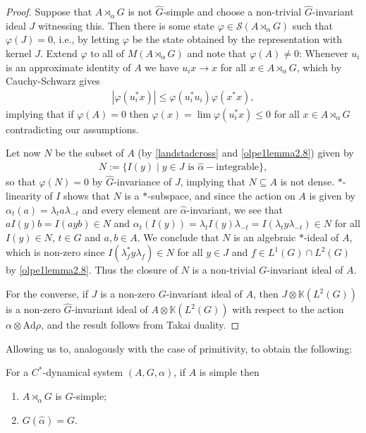 \begin{proof}
	Suppose that $A \rtimes_\alpha G$ is not $\hat G$-simple and choose a non-trivial $\hat G$-invariant ideal $J$ witnessing this. Then there is some state $\varphi \in \mathcal{S}(A \rtimes_\alpha G)$ such that $\varphi(J) = 0$, i.e., by letting $\varphi$ be the state obtained by the representation with kernel $J$. Extend $\varphi$ to all of $M(A \rtimes_\alpha G)$ and note that $\varphi(A) \neq 0$: Whenever $u_i$ is an approximate identity of $A$ we have $u_i x \to x$ for all $x \in A \rtimes_\alpha G$, which by Cauchy-Schwarz gives
	\begin{align*}
	|\varphi(u_i^* x)| \leq \varphi(u_i^*u_i)\varphi(x^*x),
	\end{align*}
	implying that if $\varphi(A) = 0$ then $\varphi(x) = \lim \varphi(u_i^* x) \leq 0$ for all $x \in A \rtimes_\alpha G$ contradicting our assumptions.
	
	Let now $N$ be the subset of $A$ (by \cref{landstadcross} and \cref{olpe1lemma2.8}) given by
	\begin{align*}
		N:=\{ I(y) \mid y \in J \text{ is } \hat \alpha-\text{integrable}\},
	\end{align*}
	so that $\varphi(N) = 0$ by $\hat G$-invariance of $J$, implying that $N \subseteq A$ is not dense. $*$-linearity of $I$ shows that $N$ is a $*$-subspace, and since the action on $A$ is given by $\alpha_t(a) = \lambda_t a \lambda_{-t}$ and every element are $\hat \alpha$-invariant, we see that $a I(y) b = I(ayb) \in N$ and $\alpha_t(I(y)) = \lambda_t I(y) \lambda_{-t} = I(\lambda_t y \lambda_{-t}) \in N$ for all $I(y)\in N$, $t \in G$ and $a,b \in A$. We conclude that $N$ is an algebraic $*$-ideal of $A$, which is non-zero since $I(\lambda_f^* y \lambda_f) \in N$ for all $y \in J$ and $f \in L^1(G) \cap L^2(G)$ by \cref{olpe1lemma2.8}. Thus the closure of $N$ is a non-trivial $G$-invariant ideal of $A$.

	For the converse, if $J$ is a non-zero $G$-invariant ideal of $A$, then $J \otimes \mathbb{K}(L^2(G))$ is a non-zero $\hat G$-invariant ideal of $A \otimes \mathbb{K}(L^2(G))$ with respect to the action $\alpha \otimes \mathrm{Ad} \rho$, and the result follows from Takai duality.
\end{proof}
Allowing us to, analogously with the case of primitivity, to obtain the following:
\begin{proposition}	
	For a $C^*$-dynamical system $(A,G,\alpha)$, if $A$ is simple then
\begin{enumerate}
	\item $A \rtimes_\alpha G$ is $\hat G$-simple;
	\item $G(\hat \alpha) = G$.
\end{enumerate}
\end{proposition}
